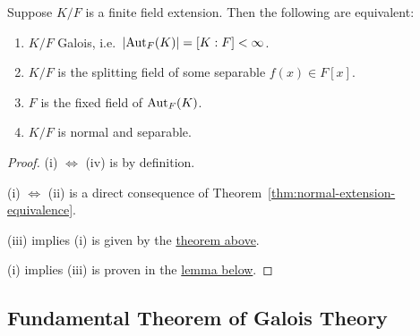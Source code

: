 \begin{theorem}\label{thm:galois-extension-definition}
    Suppose \(K/F\) is a finite field extension.
    Then the following are equivalent:
    \begin{enumerate}[label={(\roman*)}, itemsep=0mm]
        \item \(K/F\) Galois, i.e.\ \(\abs{\operatorname{Aut}_F(K)} = [K:F] < \infty\).
        \item \(K/F\) is the splitting field of some separable \(f(x) \in F[x]\).
        \item \(F\) is the fixed field of \(\operatorname{Aut}_F(K)\).
        \item \(K/F\) is normal and separable.
    \end{enumerate}
\end{theorem}
\begin{proof}
    (i) \(\iff\) (iv) is by definition.

    (i) \(\iff\) (ii) is a direct consequence of Theorem~\ref{thm:normal-extension-equivalence}.

    (iii) implies (i) is given by the \hyperref[thm:artin-galois]{theorem above}.

    (i) implies (iii) is proven in the \hyperref[lem:galois-injective]{lemma below}.
\end{proof}

\subsection*{Fundamental Theorem of Galois Theory}

